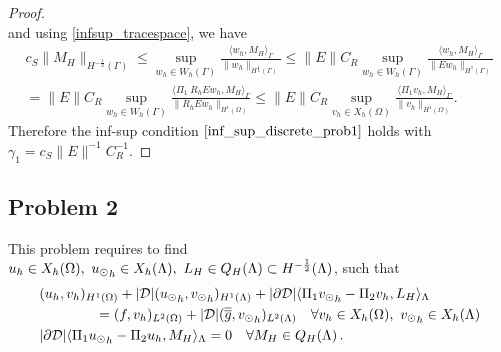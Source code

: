 \begin{proof}
\begin{equation*}
\end{equation*}
and using \eqref{infsup_tracespace}, we have
\begin{multline}
c_S \|M_H\|_{H^{-\frac 12}(\Gamma)} 
\leq 
\sup_{w_h \in W_h(\Gamma)} \frac{ \langle w_h, M_H \rangle_{\Gamma} } {\|w_h\|_{H^{\frac 12}(\Gamma)}} 
\leq
\|E\| C_R \sup_{w_h \in W_h(\Gamma)} \frac{ \langle w_h, M_H \rangle_{\Gamma} } {\|E w_h\|_{H^1(\Gamma)}}
\\
=
\|E\| C_R \sup_{w_h \in W_h(\Gamma)} \frac{ \langle \Pi_1 \ R_h E w_h, M_H \rangle_{\Gamma} } {\|R_h E w_h\|_{H^1(\Omega)}} 
\leq \|E\| C_R \sup_{v_h \in X_h(\Omega)} \frac{ \langle \Pi_1 v_h, M_H \rangle_{\Gamma} } {\|v_h\|_{H^1(\Omega)}}. 
\end{multline}
Therefore the inf-sup condition $\eqref{inf_sup_discrete_prob1}$ holds with $\gamma_1 = c_S\|E\|^{-1} C_R^{-1}$.
\end{proof}


\subsection{Problem 2}
This problem requires to find  $u_h \in X_h(\Omega) ,\ {u_{\odot}}_h \in X_h(\Lambda), \ L_H \in Q_H(\Lambda) \subset H^{-\frac12}(\Lambda)$, such that
\begin{subequations}
\begin{align*}
&(u_h,v_h)_{H^1(\Omega)} + |{\cal D}|({\ud}_h,{\vd}_h)_{H^1(\Lambda)} 
+ |\partial {\cal D}| \langle  \Pi_1 {\vd}_h - \Pi_2 v_h, L_H \rangle_\Lambda 
\\
\nonumber
&\qquad\qquad= (f,v_h)_{L^2(\Omega)} + |{\cal D}| (\avrd{g},{\vd}_h)_{L^2(\Lambda)}
\quad \forall v_h \in X_h(\Omega), \ {\vd}_h \in X_h(\Lambda)
\\
&  |\partial {\cal D}| \langle \Pi_1 {\ud}_h - \Pi_2 u_h, M_H \rangle_\Lambda = 0
\quad \forall M_H \in Q_H(\Lambda)\,.
\end{align*}
\end{subequations}

